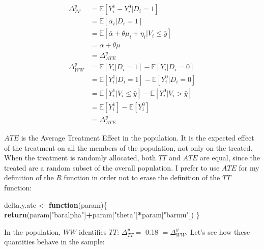 \documentclass[]{book}
\newenvironment{Shaded}{\begin{snugshade}}{\end{snugshade}}
\newcommand{\KeywordTok}[1]{\textcolor[rgb]{0.13,0.29,0.53}{\textbf{#1}}}
\newcommand{\StringTok}[1]{\textcolor[rgb]{0.31,0.60,0.02}{#1}}
\newcommand{\ControlFlowTok}[1]{\textcolor[rgb]{0.13,0.29,0.53}{\textbf{#1}}}
\newcommand{\OperatorTok}[1]{\textcolor[rgb]{0.81,0.36,0.00}{\textbf{#1}}}
\newcommand{\NormalTok}[1]{#1}
\newcommand{\esp}[1]{\mathbb{E}[ #1 ]}
\theoremstyle{definition}
\theoremstyle{definition}
\theoremstyle{definition}
\theoremstyle{remark}
\begin{document}
\begin{align*}
\Delta^y_{TT} & = \esp{Y_i^1-Y_i^0|D_i=1} \\
              & = \esp{\alpha_i|D_i=1} \\
              & = \esp{\bar{\alpha}+\theta\mu_i+\eta_i|V_i\leq\bar{y}}\\
              & = \bar{\alpha}+\theta\bar{\mu} \\
              & = \Delta^y_{ATE} \\
\Delta^y_{WW} & = \esp{Y_i|D_i=1} - \esp{Y_i|D_i=0} \\
              & = \esp{Y^1_i|D_i=1} - \esp{Y^0_i|D_i=0} \\
              & = \esp{Y^1_i|V_i\leq\bar{y}} - \esp{Y^0_i|V_i>\bar{y}} \\
              & = \esp{Y^1_i} - \esp{Y^0_i} \\
              & = \Delta^y_{ATE}
\end{align*}

\(ATE\) is the Average Treatment Effect in the population. It is the
expected effect of the treatment on all the members of the population,
not only on the treated. When the treatment is randomly allocated, both
\(TT\) and \(ATE\) are equal, since the treated are a random subset of
the overall population. I prefer to use \(ATE\) for my definition of the
\(R\) function in order not to erase the definition of the \(TT\)
function:

\begin{Shaded}
\begin{Highlighting}[]
\NormalTok{delta.y.ate <-}\StringTok{ }\ControlFlowTok{function}\NormalTok{(param)\{}
  \KeywordTok{return}\NormalTok{(param[}\StringTok{"baralpha"}\NormalTok{]}\OperatorTok{+}\NormalTok{param[}\StringTok{"theta"}\NormalTok{]}\OperatorTok{*}\NormalTok{param[}\StringTok{"barmu"}\NormalTok{])}
\NormalTok{\}}
\end{Highlighting}
\end{Shaded}

In the population, \(WW\) identifies \(TT\): \(\Delta^y_{TT}=\) 0.18
\(=\Delta^y_{WW}\). Let's see how these quantities behave in the sample:
\end{document}
